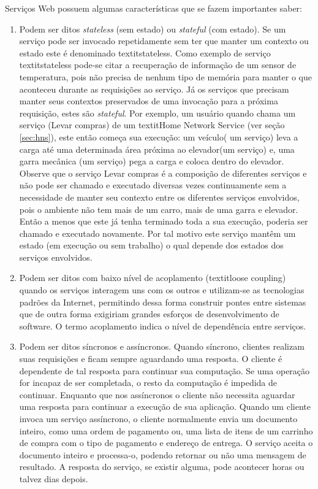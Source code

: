 Serviços Web possuem algumas características que se fazem importantes saber:
\begin{enumerate}
\item Podem ser ditos \textit{stateless} (sem estado) ou \textit{stateful} (com estado). Se um serviço pode ser invocado repetidamente sem ter que manter um contexto ou estado este é denominado textit{stateless}. Como exemplo de serviço textit{stateless} pode-se citar a recuperação de informação de um sensor de temperatura, pois não precisa de nenhum tipo de memória para manter o que aconteceu durante as requisições ao serviço. Já os serviços que precisam manter seus contextos preservados de uma invocação para a próxima requisição, estes são \textit{stateful}. Por exemplo, um usuário quando chama um serviço (Levar compras) de um textit{Home Network Service} (ver seção \ref{sec:hns}), este então começa sua execução: um veículo( um serviço) leva a carga até uma determinada área próxima ao elevador(um serviço) e, uma garra mecânica (um serviço) pega a carga e coloca dentro do elevador. Observe que o serviço Levar compras é a composição de diferentes serviços e não pode ser chamado e executado diversas vezes continuamente sem a necessidade de manter seu contexto entre os diferentes serviços envolvidos, pois o ambiente não tem mais de um carro, mais de uma garra e elevador. Então a menos que este já tenha terminado toda a sua execução, poderia ser chamado e executado novamente. Por tal motivo este serviço mantêm um estado (em execução ou sem trabalho) o qual depende dos estados dos serviços envolvidos.\cite{Papazoglou:2008}
\item Podem ser ditos com baixo nível de acoplamento (textit{loose coupling}) quando os serviços interagem uns com os outros e utilizam-se as tecnologias padrões da Internet, permitindo dessa forma construir pontes entre sistemas que de outra forma exigiriam grandes esforços de desenvolvimento de software. O termo acoplamento indica o nível de dependência entre serviços.\cite{Papazoglou:2008}
\item Podem ser ditos síncronos e assíncronos. Quando síncrono, clientes realizam suas requisições e ficam sempre aguardando uma resposta. O cliente é dependente de tal resposta para continuar sua computação. Se uma operação for incapaz de ser completada, o resto da computação é impedida de continuar. Enquanto que nos assíncronos o cliente não necessita aguardar uma resposta para continuar a execução de sua aplicação. Quando um cliente invoca um serviço assíncrono, o cliente normalmente envia um documento inteiro, como uma ordem de pagamento ou, uma lista de itens de um carrinho de compra com o tipo de pagamento e endereço de entrega. O serviço aceita o documento inteiro e processa-o, podendo retornar ou não uma mensagem de resultado. A resposta do serviço, se existir alguma, pode acontecer horas ou talvez dias depois.\cite{Papazoglou:2008}
\end{enumerate}

